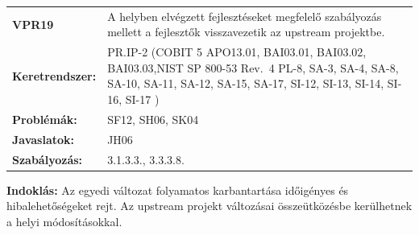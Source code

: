 \documentclass[12pt,magyar,a4paper,oneside]{scrreprt}
\begin{document}
\begin{longtable}[]{@{}ll@{}}
\toprule
\endhead
\begin{minipage}[t]{0.16\columnwidth}\raggedright
\textbf{VPR19}\strut
\end{minipage} & \begin{minipage}[t]{0.79\columnwidth}\raggedright
A helyben elvégzett fejlesztéseket megfelelő szabályozás mellett a
fejlesztők visszavezetik az upstream projektbe.\strut
\end{minipage}\tabularnewline
\begin{minipage}[t]{0.16\columnwidth}\raggedright
\textbf{Keretrendszer:}\strut
\end{minipage} & \begin{minipage}[t]{0.79\columnwidth}\raggedright
PR.IP-2 (COBIT 5 APO13.01, BAI03.01, BAI03.02, BAI03.03,NIST SP 800-53
Rev.~4 PL-8, SA-3, SA-4, SA-8, SA-10, SA-11, SA-12, SA-15, SA-17, SI-12,
SI-13, SI-14, SI-16, SI-17 )\strut
\end{minipage}\tabularnewline
\begin{minipage}[t]{0.16\columnwidth}\raggedright
\textbf{Problémák:}\strut
\end{minipage} & \begin{minipage}[t]{0.79\columnwidth}\raggedright
SF12, SH06, SK04\strut
\end{minipage}\tabularnewline
\begin{minipage}[t]{0.16\columnwidth}\raggedright
\textbf{Javaslatok:}\strut
\end{minipage} & \begin{minipage}[t]{0.79\columnwidth}\raggedright
JH06\strut
\end{minipage}\tabularnewline
\begin{minipage}[t]{0.16\columnwidth}\raggedright
\textbf{Szabályozás:}\strut
\end{minipage} & \begin{minipage}[t]{0.79\columnwidth}\raggedright
3.1.3.3., 3.3.3.8.\strut
\end{minipage}\tabularnewline
\bottomrule
\end{longtable}

\textbf{Indoklás: } Az egyedi változat folyamatos karbantartása
időigényes és hibalehetőségeket rejt. Az upstream projekt változásai
összeütközésbe kerülhetnek a helyi módosításokkal.
\end{document}

